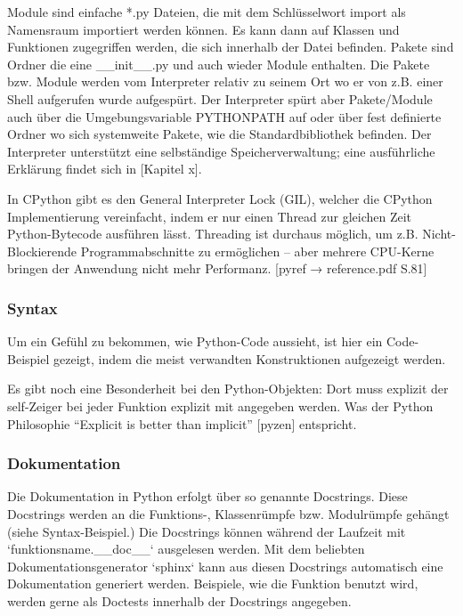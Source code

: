 Module sind einfache *.py Dateien, die mit dem Schlüsselwort import als
Namensraum importiert werden können. Es kann dann auf Klassen und Funktionen
zugegriffen werden, die sich innerhalb der Datei befinden. Pakete sind
Ordner die eine \_\_init\_\_.py und auch wieder Module enthalten. Die Pakete
bzw. Module werden vom Interpreter relativ zu seinem Ort wo er von z.B. einer
Shell aufgerufen wurde aufgespürt. Der Interpreter spürt aber Pakete/Module
auch über die Umgebungsvariable PYTHONPATH auf oder über fest definierte
Ordner wo sich systemweite Pakete, wie die Standardbibliothek befinden.
Der Interpreter unterstützt eine selbständige Speicherverwaltung; eine
ausführliche Erklärung findet sich in [Kapitel x].

In CPython gibt es den General Interpreter Lock (GIL), welcher die CPython
Implementierung vereinfacht, indem er nur einen Thread zur gleichen Zeit
Python-Bytecode ausführen lässt. Threading ist durchaus möglich, um z.B.
Nicht-Blockierende Programmabschnitte zu ermöglichen -- aber mehrere CPU-Kerne
bringen der Anwendung nicht mehr Performanz. [pyref → reference.pdf S.81]


\subsubsection{Syntax}


Um ein Gefühl zu bekommen, wie Python-Code aussieht, ist hier ein Code-Beispiel
gezeigt, indem die meist verwandten Konstruktionen aufgezeigt werden.





Es gibt noch eine Besonderheit bei den Python-Objekten: Dort muss explizit der
self-Zeiger bei jeder Funktion explizit mit angegeben werden. Was der Python
Philosophie  “Explicit is better than implicit” [pyzen] entspricht.


\subsubsection{Dokumentation}


Die Dokumentation in Python erfolgt über so genannte Docstrings. Diese
Docstrings werden an die Funktions-, Klassenrümpfe bzw. Modulrümpfe gehängt
(siehe Syntax-Beispiel.) Die Docstrings können während der Laufzeit mit
`funktionsname.\_\_doc\_\_` ausgelesen werden. Mit dem beliebten
Dokumentationsgenerator `sphinx` kann aus diesen Docstrings automatisch
eine Dokumentation generiert werden.
Beispiele, wie die Funktion benutzt wird, werden gerne als Doctests innerhalb
der Docstrings angegeben.



